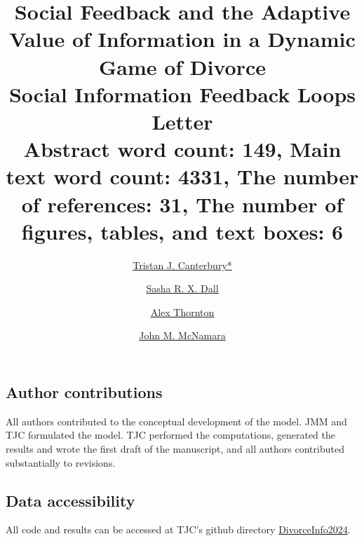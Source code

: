 \documentclass[10pt]{article} %
\begin{document}
\title{\textbf{Social Feedback and the Adaptive Value of Information in a Dynamic Game of Divorce}\\
	\large \textbf{Social Information Feedback Loops}\\ 
	\small Letter\\
 	Abstract word count: 149, Main text word count: 4331, The number of references: 31, The number of figures, tables, and text boxes: 6\\
}

\author[1]{\href{mailto:tc661@exeter.ac.uk}{Tristan J. Canterbury*}}
\author[1]{\href{mailto:s.r.x.dall@exeter.ac.uk}{Sasha R. X. Dall}}
\author[1]{\href{mailto:alex.thornton@exeter.ac.uk}{Alex Thornton}}
\author[2]{\href{mailto:john.mcnamara@bristol.ac.uk}{John M. McNamara}}


\begingroup
\let\center\flushleft
\let\endcenter\endflushleft
\maketitle
\endgroup

\sloppy

\doublespacing %
\subsection{Author contributions}
All authors contributed to the conceptual development of the model. JMM and TJC formulated the model. TJC performed the computations, generated the results and wrote the first draft of the manuscript, and all authors contributed substantially to revisions. 

\subsection{Data accessibility} All code and results can be accessed at TJC's github directory \href{https://github.com/TJCanterbury/DivorceInfo2024}{DivorceInfo2024}.
\end{document}
